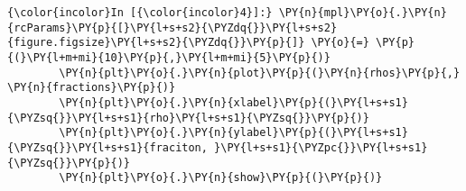     \begin{Verbatim}[commandchars=\\\{\}]
{\color{incolor}In [{\color{incolor}4}]:} \PY{n}{mpl}\PY{o}{.}\PY{n}{rcParams}\PY{p}{[}\PY{l+s+s2}{\PYZdq{}}\PY{l+s+s2}{figure.figsize}\PY{l+s+s2}{\PYZdq{}}\PY{p}{]} \PY{o}{=} \PY{p}{(}\PY{l+m+mi}{10}\PY{p}{,}\PY{l+m+mi}{5}\PY{p}{)}
        \PY{n}{plt}\PY{o}{.}\PY{n}{plot}\PY{p}{(}\PY{n}{rhos}\PY{p}{,} \PY{n}{fractions}\PY{p}{)}
        \PY{n}{plt}\PY{o}{.}\PY{n}{xlabel}\PY{p}{(}\PY{l+s+s1}{\PYZsq{}}\PY{l+s+s1}{rho}\PY{l+s+s1}{\PYZsq{}}\PY{p}{)}
        \PY{n}{plt}\PY{o}{.}\PY{n}{ylabel}\PY{p}{(}\PY{l+s+s1}{\PYZsq{}}\PY{l+s+s1}{fraciton, }\PY{l+s+s1}{\PYZpc{}}\PY{l+s+s1}{\PYZsq{}}\PY{p}{)}
        \PY{n}{plt}\PY{o}{.}\PY{n}{show}\PY{p}{(}\PY{p}{)}
\end{Verbatim}

    \begin{center}
    \end{center}
    { \hspace*{\fill} \\}